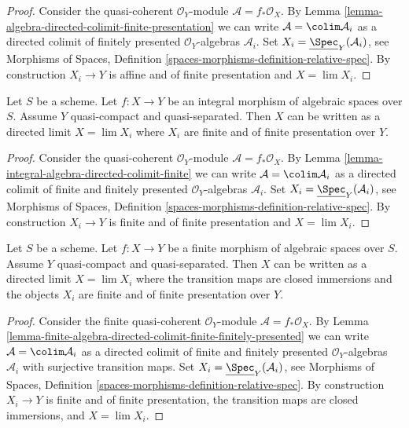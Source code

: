 \begin{proof}
Consider the quasi-coherent $\mathcal{O}_Y$-module
$\mathcal{A} = f_*\mathcal{O}_X$. By
Lemma \ref{lemma-algebra-directed-colimit-finite-presentation}
we can write $\mathcal{A} = \colim \mathcal{A}_i$ as a directed
colimit of finitely presented
$\mathcal{O}_Y$-algebras $\mathcal{A}_i$.
Set $X_i = \underline{\Spec}_Y(\mathcal{A}_i)$, see
Morphisms of Spaces, Definition
\ref{spaces-morphisms-definition-relative-spec}.
By construction $X_i \to Y$ is affine and of finite presentation
and $X = \lim X_i$.
\end{proof}

\begin{lemma}
\label{lemma-integral-limit-finite-and-finite-presentation}
Let $S$ be a scheme. Let $f : X \to Y$ be an integral morphism of algebraic
spaces over $S$. Assume $Y$ quasi-compact and quasi-separated.
Then $X$ can be written as a directed limit $X = \lim X_i$
where $X_i$ are finite and of finite presentation over $Y$.
\end{lemma}

\begin{proof}
Consider the quasi-coherent $\mathcal{O}_Y$-module
$\mathcal{A} = f_*\mathcal{O}_X$. By
Lemma \ref{lemma-integral-algebra-directed-colimit-finite}
we can write $\mathcal{A} = \colim \mathcal{A}_i$ as a directed
colimit of finite and finitely presented $\mathcal{O}_Y$-algebras
$\mathcal{A}_i$.
Set $X_i = \underline{\Spec}_Y(\mathcal{A}_i)$, see
Morphisms of Spaces, Definition
\ref{spaces-morphisms-definition-relative-spec}.
By construction $X_i \to Y$ is finite and of finite presentation and
$X = \lim X_i$.
\end{proof}

\begin{lemma}
\label{lemma-finite-in-finite-and-finite-presentation}
Let $S$ be a scheme. Let $f : X \to Y$ be a finite morphism of algebraic
spaces over $S$. Assume $Y$ quasi-compact and quasi-separated.
Then $X$ can be written as a directed limit $X = \lim X_i$
where the transition maps are closed immersions and the objects
$X_i$ are finite and of finite presentation over $Y$.
\end{lemma}

\begin{proof}
Consider the finite quasi-coherent $\mathcal{O}_Y$-module
$\mathcal{A} = f_*\mathcal{O}_X$. By
Lemma \ref{lemma-finite-algebra-directed-colimit-finite-finitely-presented}
we can write $\mathcal{A} = \colim \mathcal{A}_i$ as a directed
colimit of finite and finitely presented $\mathcal{O}_Y$-algebras
$\mathcal{A}_i$ with surjective transition maps.
Set $X_i = \underline{\Spec}_Y(\mathcal{A}_i)$, see
Morphisms of Spaces, Definition
\ref{spaces-morphisms-definition-relative-spec}.
By construction $X_i \to Y$ is finite and of finite presentation,
the transition maps are closed immersions, and $X = \lim X_i$.
\end{proof}

